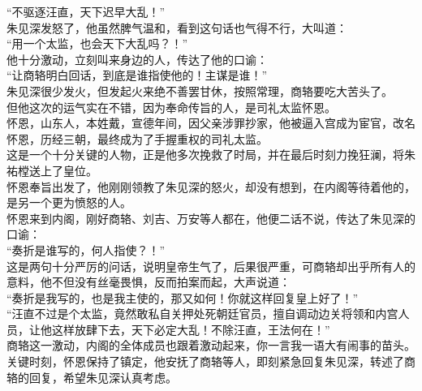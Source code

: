 \begin{multicols}{\theparacolNo}
“不驱逐汪直，天下迟早大乱！”\\

朱见深发怒了，他虽然脾气温和，看到这句话也气得不行，大叫道：\\

“用一个太监，也会天下大乱吗？！”\\

他十分激动，立刻叫来身边的人，传达了他的口谕：\\

“让商辂明白回话，到底是谁指使他的！主谋是谁！”\\

朱见深很少发火，但发起火来绝不善罢甘休，按照常理，商辂要吃大苦头了。\\

但他这次的运气实在不错，因为奉命传旨的人，是司礼太监怀恩。\\

怀恩，山东人，本姓戴，宣德年间，因父亲涉罪抄家，他被逼入宫成为宦官，改名怀恩，历经三朝，最终成为了手握重权的司礼太监。\\

这是一个十分关键的人物，正是他多次挽救了时局，并在最后时刻力挽狂澜，将朱祐樘送上了皇位。\\

怀恩奉旨出发了，他刚刚领教了朱见深的怒火，却没有想到，在内阁等待着他的，是另一个更为愤怒的人。\\

怀恩来到内阁，刚好商辂、刘吉、万安等人都在，他便二话不说，传达了朱见深的口谕：\\

“奏折是谁写的，何人指使？！”\\

这是两句十分严厉的问话，说明皇帝生气了，后果很严重，可商辂却出乎所有人的意料，他不但没有丝毫畏惧，反而拍案而起，大声说道：\\

“奏折是我写的，也是我主使的，那又如何！你就这样回复皇上好了！”\\

“汪直不过是个太监，竟然敢私自关押处死朝廷官员，擅自调动边关将领和内宫人员，让他这样放肆下去，天下必定大乱！不除汪直，王法何在！”\\

商辂这一激动，内阁的全体成员也跟着激动起来，你一言我一语大有闹事的苗头。\\

关键时刻，怀恩保持了镇定，他安抚了商辂等人，即刻紧急回复朱见深，转述了商辂的回复，希望朱见深认真考虑。\\


\end{multicols}
